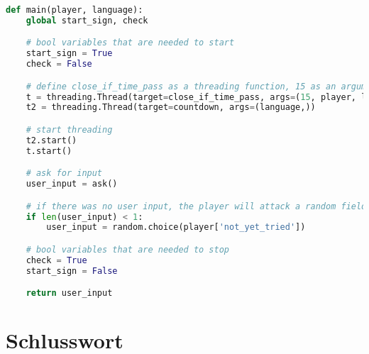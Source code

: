 \documentclass{article}
\begin{document}
\begin{lstlisting}[language=Python, caption=Main Funktion des Countdowns]
def main(player, language):
    global start_sign, check

    # bool variables that are needed to start
    start_sign = True
    check = False

    # define close_if_time_pass as a threading function, 15 as an argument
    t = threading.Thread(target=close_if_time_pass, args=(15, player, language,))
    t2 = threading.Thread(target=countdown, args=(language,))

    # start threading
    t2.start()
    t.start()

    # ask for input
    user_input = ask()

    # if there was no user input, the player will attack a random field automatically
    if len(user_input) < 1:
        user_input = random.choice(player['not_yet_tried'])

    # bool variables that are needed to stop
    check = True
    start_sign = False

    return user_input
\end{lstlisting}

\section{Schlusswort}
\end{document}

